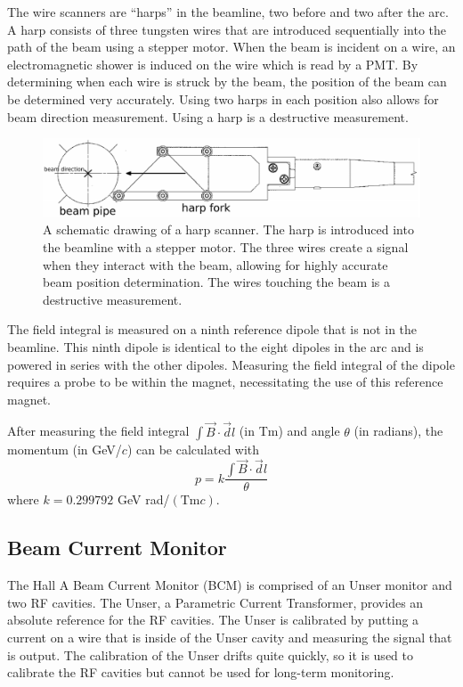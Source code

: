 The wire scanners are ``harps'' in the beamline, two before and two after the arc. A harp consists of three tungsten wires that are introduced sequentially into the path of the beam using a stepper motor. When the beam is incident on a wire, an electromagnetic shower is induced on the wire which is read by a PMT. By determining when each wire is struck by the beam, the position of the beam can be determined very accurately. Using two harps in each position also allows for beam direction measurement. Using a harp is a destructive measurement. 

\begin{figure}[h]
\begin{center}
	\includegraphics[width=\textwidth]{./setup/fig/harp.png}
	\caption{A schematic drawing of a harp scanner. The harp is introduced into the beamline with a stepper motor. The three wires create a signal when they interact with the beam, allowing for highly accurate beam position determination. The wires touching the beam is a destructive measurement.\cite{harp_schem}}
\end{center}
\end{figure}

The field integral is measured on a ninth reference dipole that is not in the beamline. This ninth dipole is identical to the eight dipoles in the arc and is powered in series with the other dipoles. Measuring the field integral of the dipole requires a probe to be within the magnet, necessitating the use of this reference magnet.\cite{HASEM}

After measuring the field integral $\int\vec{B}\cdot\vec{d}l$ (in Tm) and angle $\theta$ (in radians), the momentum (in GeV/$c$) can be calculated with
\begin{equation}
	p = k\frac{\int\vec{B}\cdot\vec{d}l}{\theta}
\end{equation}
where $k=0.299792$ GeV rad/$\left(\textrm{Tm}c\right)$.

\subsection{Beam Current Monitor}

The Hall A Beam Current Monitor (BCM) is comprised of an Unser monitor and two RF cavities. The Unser, a Parametric Current Transformer, provides an absolute reference for the RF cavities. The Unser is calibrated by putting a current on a wire that is inside of the Unser cavity and measuring the signal that is output. The calibration of the Unser drifts quite quickly, so it is used to calibrate the RF cavities but cannot be used for long-term monitoring.

